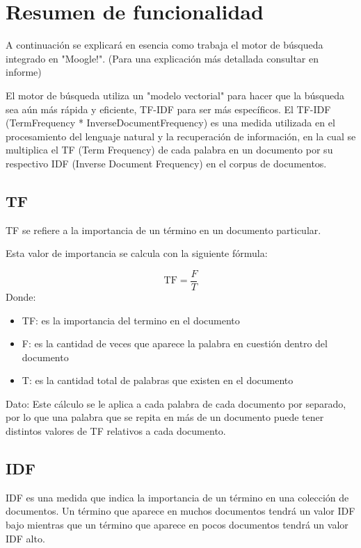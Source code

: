 \documentclass[a4paper,12pt]{article}
\begin{document}
\section{Resumen de funcionalidad}\label{sec:res}
A continuación se explicará en esencia como trabaja el motor de búsqueda integrado en "Moogle!". (Para una explicación más detallada consultar en informe)

El motor de búsqueda utiliza un "modelo vectorial" para hacer que la búsqueda sea aún más rápida y eficiente, TF-IDF para ser más específicos. El TF-IDF (TermFrequency * InverseDocumentFrequency) es una medida utilizada en el procesamiento del lenguaje natural y la recuperación de información, en la cual se multiplica el TF (Term Frequency) de cada palabra en un documento por su respectivo IDF (Inverse Document Frequency) en el corpus de documentos.

\subsection{TF}
TF se refiere a la importancia de un término en un documento particular.

Esta valor de importancia se calcula con la siguiente fórmula:

\begin{equation}
    \mathrm{TF} = \frac{F}{T}
\end{equation}
Donde:
\begin{itemize}
    \item{TF: es la importancia del termino en el documento}
    \item{F: es la cantidad de veces que aparece la palabra en cuestión dentro del documento}
    \item{T: es la cantidad total de palabras que existen en el documento}
\end{itemize}

Dato: Este cálculo se le aplica a cada palabra de cada documento por separado, por lo que una palabra que se repita en más de un documento puede tener distintos valores de TF relativos a cada documento.

\subsection{IDF}
IDF es una medida que indica la importancia de un término en una colección de documentos. Un término que aparece en muchos documentos tendrá un valor IDF bajo mientras que un término que aparece en pocos documentos tendrá un valor IDF alto.
\end{document}
